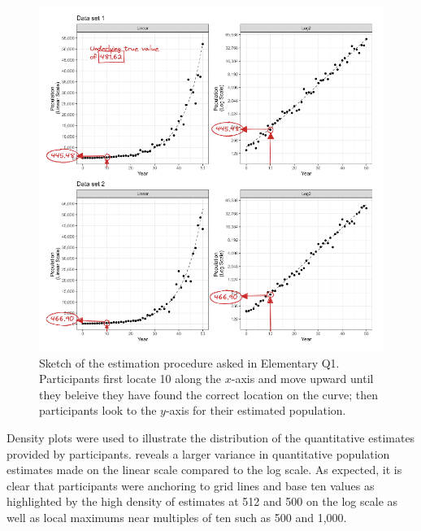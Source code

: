 \documentclass[print]{nuthesis}
\begin{document}
\begin{figure}[tbp]

{\centering \includegraphics[width=1\linewidth,]{images/03-estimation/qe1-sketch} 

}

\caption[Elementary Q1 sketch]{Sketch of the estimation procedure asked in Elementary Q1. Participants first locate 10 along the $x$-axis and move upward until they beleive they have found the correct location on the curve; then participants look to the $y$-axis for their estimated population.}\label{fig:qe1-sketch}
\end{figure}

Density plots were used to illustrate the distribution of the quantitative estimates provided by participants.
 reveals a larger variance in quantitative population estimates made on the linear scale compared to the log scale.
As expected, it is clear that participants were anchoring to grid lines and base ten values as highlighted by the high density of estimates at 512 and 500 on the log scale as well as local maximums near multiples of ten such as 500 and 1,000.
\end{document}
